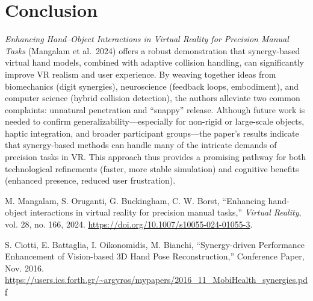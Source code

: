 \documentclass[11pt]{llncs}
\begin{document}
\section*{Conclusion}
\emph{Enhancing Hand--Object Interactions in Virtual Reality for Precision Manual Tasks} (Mangalam et al.\ 2024) offers a robust demonstration that synergy-based virtual hand models, combined with adaptive collision handling, can significantly improve VR realism and user experience. By weaving together ideas from biomechanics (digit synergies), neuroscience (feedback loops, embodiment), and computer science (hybrid collision detection), the authors alleviate two common complaints: unnatural penetration and ``snappy'' release. Although future work is needed to confirm generalizability---especially for non-rigid or large-scale objects, haptic integration, and broader participant groups---the paper’s results indicate that synergy-based methods can handle many of the intricate demands of precision tasks in VR. This approach thus provides a promising pathway for both technological refinements (faster, more stable simulation) and cognitive benefits (enhanced presence, reduced user frustration).

\vspace{1em}
\noindent

\begin{thebibliography}{1}

M. Mangalam, S. Oruganti, G. Buckingham, C. W. Borst,
``Enhancing hand-object interactions in virtual reality for precision manual tasks,''
\textit{Virtual Reality},
vol. 28, no. 166, 2024.
\url{https://doi.org/10.1007/s10055-024-01055-3}.

S. Ciotti, E. Battaglia, I. Oikonomidis, M. Bianchi,
``Synergy-driven Performance Enhancement of Vision-based 3D Hand Pose Reconstruction,''
Conference Paper, Nov. 2016.
\url{https://users.ics.forth.gr/~argyros/mypapers/2016_11_MobiHealth_synergies.pdf}

\end{thebibliography}
\end{document}
